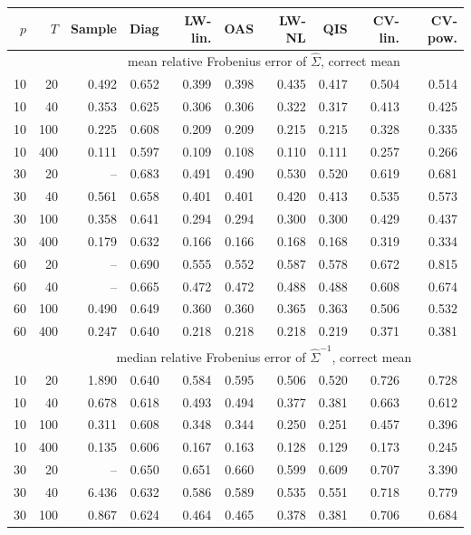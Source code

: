 \begin{tabular}{@{}rrrrrrrrrr@{}}
\toprule
$p$ & $T$ & Sample & Diag & LW-lin. & OAS & LW-NL & QIS & CV-lin. & CV-pow. \\
\midrule
 & & \multicolumn{8}{c}{mean relative Frobenius error of $\hat\Sigma$, correct mean}\\
\midrule
10 & 20 & 0.492 & 0.652 & 0.399 & 0.398 & 0.435 & 0.417 & 0.504 & 0.514 \\
10 & 40 & 0.353 & 0.625 & 0.306 & 0.306 & 0.322 & 0.317 & 0.413 & 0.425 \\
10 & 100 & 0.225 & 0.608 & 0.209 & 0.209 & 0.215 & 0.215 & 0.328 & 0.335 \\
10 & 400 & 0.111 & 0.597 & 0.109 & 0.108 & 0.110 & 0.111 & 0.257 & 0.266 \\
30 & 20 & -- & 0.683 & 0.491 & 0.490 & 0.530 & 0.520 & 0.619 & 0.681 \\
30 & 40 & 0.561 & 0.658 & 0.401 & 0.401 & 0.420 & 0.413 & 0.535 & 0.573 \\
30 & 100 & 0.358 & 0.641 & 0.294 & 0.294 & 0.300 & 0.300 & 0.429 & 0.437 \\
30 & 400 & 0.179 & 0.632 & 0.166 & 0.166 & 0.168 & 0.168 & 0.319 & 0.334 \\
60 & 20 & -- & 0.690 & 0.555 & 0.552 & 0.587 & 0.578 & 0.672 & 0.815 \\
60 & 40 & -- & 0.665 & 0.472 & 0.472 & 0.488 & 0.488 & 0.608 & 0.674 \\
60 & 100 & 0.490 & 0.649 & 0.360 & 0.360 & 0.365 & 0.363 & 0.506 & 0.532 \\
60 & 400 & 0.247 & 0.640 & 0.218 & 0.218 & 0.218 & 0.219 & 0.371 & 0.381 \\
\midrule
 & & \multicolumn{8}{c}{median relative Frobenius error of $\hat\Sigma^{-1}$, correct mean}\\
\midrule
10 & 20 & 1.890 & 0.640 & 0.584 & 0.595 & 0.506 & 0.520 & 0.726 & 0.728 \\
10 & 40 & 0.678 & 0.618 & 0.493 & 0.494 & 0.377 & 0.381 & 0.663 & 0.612 \\
10 & 100 & 0.311 & 0.608 & 0.348 & 0.344 & 0.250 & 0.251 & 0.457 & 0.396 \\
10 & 400 & 0.135 & 0.606 & 0.167 & 0.163 & 0.128 & 0.129 & 0.173 & 0.245 \\
30 & 20 & -- & 0.650 & 0.651 & 0.660 & 0.599 & 0.609 & 0.707 & 3.390 \\
30 & 40 & 6.436 & 0.632 & 0.586 & 0.589 & 0.535 & 0.551 & 0.718 & 0.779 \\
30 & 100 & 0.867 & 0.624 & 0.464 & 0.465 & 0.378 & 0.381 & 0.706 & 0.684 \\

\end{tabular}
